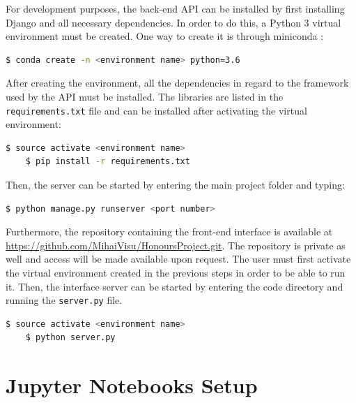 \documentclass[bsc,frontabs,twoside,singlespacing, parskip,deptreport]{infthesis}     %
\begin{document}
\begin{appendices}
For development purposes, the back-end API can be installed by first installing Django and all necessary dependencies. In order to do this, a Python 3 virtual environment must be created. One way to create it is through miniconda \cite{miniconda}:

\begin{lstlisting}[language=bash, backgroundcolor=\color{lightgray!20}, basicstyle=\ttfamily\bfseries] 
	$ conda create -n <environment name> python=3.6
\end{lstlisting}

After creating the environment, all the dependencies in regard to the framework used by the API must be installed. The libraries are listed in the \texttt{requirements.txt} file and can be installed after activating the virtual environment:

\begin{lstlisting}[language=bash, backgroundcolor=\color{lightgray!20}, basicstyle=\ttfamily\bfseries] 
	$ source activate <environment name>
	$ pip install -r requirements.txt
\end{lstlisting}

Then, the server can be started by entering the main project folder and typing:

\begin{lstlisting}[language=bash, backgroundcolor=\color{lightgray!20}, basicstyle=\ttfamily\bfseries] 
	$ python manage.py runserver <port number>
\end{lstlisting}

Furthermore, the repository containing the front-end interface is available at \url{https://github.com/MihaiVisu/HonoursProject.git}. The repository is private as well and access will be made available upon request. The user must first activate the virtual environment created in the previous steps in order to be able to run it. Then, the interface server can be started by entering the code directory and running the \texttt{server.py} file.

\begin{lstlisting}[language=bash, backgroundcolor=\color{lightgray!20}, basicstyle=\ttfamily\bfseries] 
	$ source activate <environment name>
	$ python server.py
\end{lstlisting}


\section{Jupyter Notebooks Setup}


\end{appendices}
\end{document}
